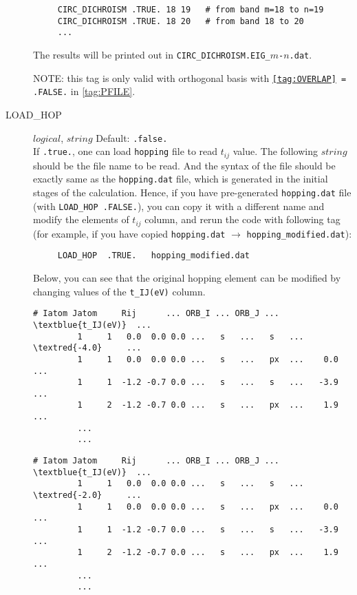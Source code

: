 \documentclass[a4paper,12pt]{scrartcl}
\makeatletter
\def\namedlabel#1#2{\begingroup
    #2%
    \def\@currentlabel{#2}%
    \phantomsection\label{#1}\endgroup
}
\newcommand{\textred}[1]{\textcolor{red!85!white}{\texttt{#1}}}
\newcommand{\textblue}[1]{\textcolor{blue!85!white}{\texttt{#1}}}
\makeatother
\begin{document}
\begin{description}
    \begin{verbatim}
     CIRC_DICHROISM .TRUE. 18 19   # from band m=18 to n=19
     CIRC_DICHROISM .TRUE. 18 20   # from band 18 to 20
     ...
    \end{verbatim}
						The results will be printed out in \texttt{CIRC\_DICHROISM.EIG\_$m$-$n$.dat}.
		
		NOTE: this tag is only valid with orthogonal basis with \texttt{\ref{tag:OVERLAP} = .FALSE.} in \ref{tag:PFILE}.

    \item[\namedlabel{tag:LOADHOP}{LOAD\_HOP}] $logical$, $string$ Default: \texttt{.false.} \\
		If \texttt{.true.}, one can load \texttt{hopping} file to read $t_{ij}$ value. The following $string$ should be the file name to be read. And the syntax of the file should be exactly same as the \texttt{hopping.dat} file, which is generated in the initial stages of the calculation.
		Hence, if you have pre-generated \texttt{hopping.dat} file (with \texttt{LOAD\_HOP .FALSE.}), you can copy it with a different name and modify the elements of $t_{ij}$ column, and rerun the code with following tag (for example, if you have copied \texttt{hopping.dat} $\rightarrow$ \texttt{hopping\_modified.dat}):
		
    \begin{verbatim}
     LOAD_HOP  .TRUE.   hopping_modified.dat
    \end{verbatim}

		Below, you can see that the original hopping element can be modified by changing values of the \textblue{t\_IJ(eV)} column.  
        \begin{Verbatim}[commandchars=\\\{\},gobble=4, frame=single, framesep=2mm, 
            label= hopping.dat example file, 
            labelposition=bottomline]
     # Iatom Jatom     Rij      ... ORB_I ... ORB_J ...  \textblue{t_IJ(eV)}  ... 
         1     1   0.0  0.0 0.0 ...   s   ...   s   ...   \textred{-4.0}     ... 
         1     1   0.0  0.0 0.0 ...   s   ...   px  ...    0.0     ... 
         1     1  -1.2 -0.7 0.0 ...   s   ...   s   ...   -3.9     ... 
         1     2  -1.2 -0.7 0.0 ...   s   ...   px  ...    1.9     ... 
         ...
         ...
        \end{Verbatim}

        \begin{Verbatim}[commandchars=\\\{\},gobble=4, frame=single, framesep=2mm, 
            label= hopping\_modified.dat example file, 
            labelposition=bottomline]
     # Iatom Jatom     Rij      ... ORB_I ... ORB_J ...  \textblue{t_IJ(eV)}  ... 
         1     1   0.0  0.0 0.0 ...   s   ...   s   ...   \textred{-2.0}     ... 
         1     1   0.0  0.0 0.0 ...   s   ...   px  ...    0.0     ... 
         1     1  -1.2 -0.7 0.0 ...   s   ...   s   ...   -3.9     ... 
         1     2  -1.2 -0.7 0.0 ...   s   ...   px  ...    1.9     ... 
         ...
         ...
        \end{Verbatim}



\end{description}
\end{document}
